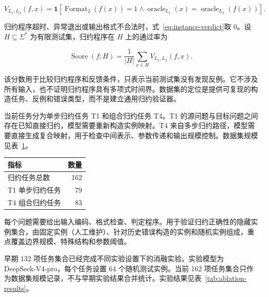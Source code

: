 \begin{equation}
    V_{L_1,L_2}(f,x)=
    \mathbf 1\!\left[
    \operatorname{Format}_2(f(x))=1
    \land
    \operatorname{oracle}_{L_1}(x)
    =
    \operatorname{oracle}_{L_2}(f(x))
    \right].
    \label{eq:instance-verdict}
\end{equation}

归约程序超时、异常退出或输出格式不合法时，式~\eqref{eq:instance-verdict}取 0。设 \(H\subseteq\Sigma^*\) 为有限测试集，归约程序在 \(H\) 上的通过率为

\begin{equation}
    \operatorname{Score}(f;H)=
    \frac{1}{|H|}
    \sum_{x\in H}V_{L_1,L_2}(f,x).
    \label{eq:empirical-score}
\end{equation}

该分数用于比较归约程序和反馈条件，只表示当前测试集没有发现反例。它不涉及所有输入，也不证明归约程序具有多项式时间界。数据集的定位是提供可复现的构造任务、反例和错误类型，而不是建立通用归约验证器。

当前任务分为单步归约任务 T1 和组合归约任务 T4。T1 的源问题与目标问题之间存在已知直接归约，模型需要重新构造实例映射。T4 来自多步归约路径，模型需要直接生成复合映射，用于检查中间表示、参数传递和输出规模控制。数据集规模见表~\ref{tab:dataset-scale}。

\begin{table}[!htbp]
    \label{tab:dataset-scale}
    \centering
    \footnotesize
    \setlength{\tabcolsep}{9pt}
    \renewcommand{\arraystretch}{1.05}
    \begin{tabular}{lr}
        \hline
        指标 & 数量\\
        \hline
        归约任务总数 & 162\\
        T1 单步归约任务 & 79\\
        T4 组合归约任务 & 83\\
        \hline
    \end{tabular}
\end{table}

每个问题需要给出输入编码、格式检查、判定程序。用于验证归约正确性的隐藏实例集合，由固定实例（人工维护）、针对历史错误构造的实例和随机实例组成，重点覆盖边界规模、特殊结构和参数阈值。

早期 132 项任务集合已经完成不同实验设置下的消融实验。实验模型为 DeepSeek-V4-pro，每个任务设置 64 个随机测试实例。当前 162 项任务集合只作为数据集规模记录，不与早期实验结果合并统计。实验结果见表~\ref{tab:ablation-results}。

